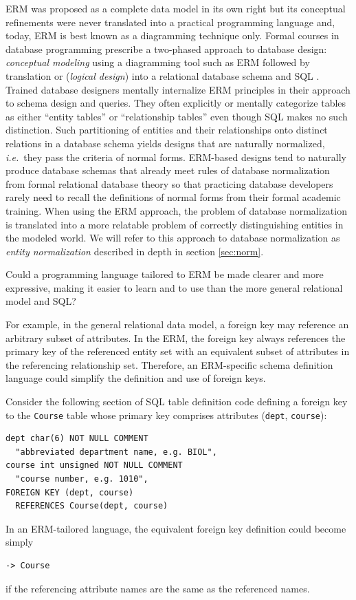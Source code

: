 \documentclass[letter,10pt]{article}
\begin{document}
ERM was proposed as a complete data model in its own right but its conceptual refinements were never translated into a practical programming language and, today, ERM is best known as a diagramming technique only.  
Formal courses in database programming prescribe a two-phased approach to database design: \emph{conceptual modeling} using a diagramming tool such as ERM followed by translation or (\emph{logical  design}) into a relational database schema and SQL \citep{elmasri-2015-fundamentals, coronel-2016-database}. 
Trained database designers mentally internalize ERM principles in their approach to schema design and queries.
They often explicitly or mentally categorize tables as either ``entity tables'' or ``relationship tables'' even though SQL makes no such distinction. 
Such partitioning of entities and their relationships onto distinct relations in a database schema yields designs that are naturally normalized, \emph{i.e.}\ they pass the criteria of normal forms. 
ERM-based designs tend to naturally produce database schemas that already  meet rules of database normalization from formal relational database theory so that practicing database developers rarely need to recall the definitions of normal forms from their formal academic training.
When using the ERM approach, the problem of database normalization is translated into a more relatable problem of correctly distinguishing entities in the modeled world.  
We will refer to this approach to database normalization as \emph{entity normalization} described in depth in section \ref{sec:norm}.


Could a programming language tailored to ERM be made clearer and more expressive, making it easier to learn and to use than the more general relational model and SQL? 

For example, in the general relational data model, a foreign key may reference an arbitrary subset of attributes. In the ERM, the foreign key always references the primary key of the referenced entity set with an equivalent subset of attributes in the referencing relationship set.  Therefore, an ERM-specific schema definition language could simplify the definition and use of foreign keys.

Consider the following section of SQL table definition code defining a foreign key to the {\tt Course} table whose primary key comprises attributes ({\tt dept}, {\tt course}):
\begin{lstlisting}[language=SSQL]
dept char(6) NOT NULL COMMENT 
  "abbreviated department name, e.g. BIOL",
course int unsigned NOT NULL COMMENT 
  "course number, e.g. 1010",
FOREIGN KEY (dept, course) 
  REFERENCES Course(dept, course)
\end{lstlisting}
In an ERM-tailored language, the equivalent foreign key definition could become simply
\begin{lstlisting}[language=dj]
-> Course
\end{lstlisting}
if the referencing attribute names are the same as the referenced names.
\end{document}
